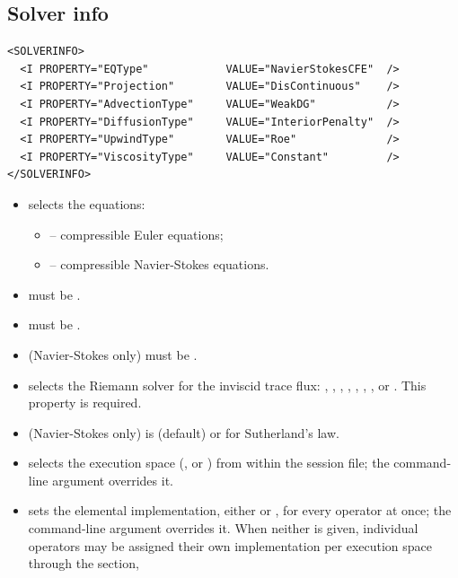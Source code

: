 \subsection*{Solver info}
\begin{lstlisting}[style=XmlStyle]
<SOLVERINFO>
  <I PROPERTY="EQType"            VALUE="NavierStokesCFE"  />
  <I PROPERTY="Projection"        VALUE="DisContinuous"    />
  <I PROPERTY="AdvectionType"     VALUE="WeakDG"           />
  <I PROPERTY="DiffusionType"     VALUE="InteriorPenalty"  />
  <I PROPERTY="UpwindType"        VALUE="Roe"              />
  <I PROPERTY="ViscosityType"     VALUE="Constant"         />
</SOLVERINFO>
\end{lstlisting}
\begin{itemize}
\item {} selects the equations:
  \begin{itemize}
  \item {} -- compressible Euler equations;
  \item {} -- compressible Navier-Stokes equations.
  \end{itemize}
\item {} must be .
\item {} must be .
\item {} (Navier-Stokes only) must be
  .
\item {} selects the Riemann solver for the inviscid trace
  flux: , , , ,
  , , ,  or
  . This property is required.
\item {} (Navier-Stokes only) is 
  (default) or  for Sutherland's law.
\item {} selects the execution space
  (,  or ) from within the session
  file; the  command-line argument overrides it.
\item {} sets the elemental implementation,
  either  or , for every operator at once;
  the  command-line argument overrides it. When
  neither is
  given, individual operators may be assigned their own implementation
  per execution space through the  section,
\begin{lstlisting}[style=XmlStyle]

\end{lstlisting}
\end{itemize}
